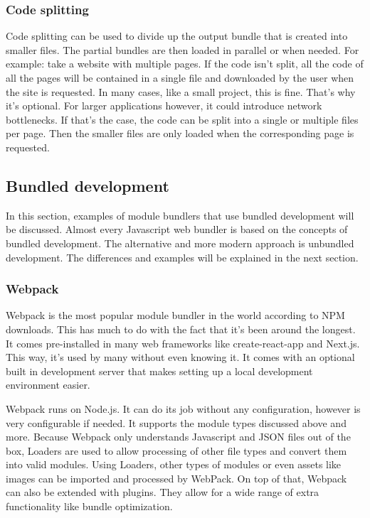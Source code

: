 \subsubsection{Code splitting}
Code splitting can be used to divide up the output bundle that is created into smaller files. The partial bundles are then loaded in parallel or when needed. For example: take a website with multiple pages. If the code isn’t split, all the code of all the pages will be contained in a single file and downloaded by the user when the site is requested. In many cases, like a small project, this is fine. That’s why it’s optional. For larger applications however, it could introduce network bottlenecks. If that’s the case, the code can be split into a single or multiple files per page. Then the smaller files are only loaded when the corresponding page is requested. 

\subsection{Bundled development}

In this section, examples of module bundlers that use bundled development will be discussed. Almost every Javascript web bundler is based on the concepts of bundled development. The alternative and more modern approach is unbundled development. The differences and examples will be explained in the next section. 

\subsubsection{Webpack}

Webpack is the most popular module bundler in the world according to NPM downloads. This has much to do with the fact that it's been around the longest. It comes pre-installed in many web frameworks like create-react-app and Next.js. This way, it’s used by many without even knowing it. It comes with an optional built in development server that makes setting up a local development environment easier.

Webpack runs on Node.js. It can do its job without any configuration, however is very configurable if needed. It supports the module types discussed above and more. 
Because Webpack only understands Javascript and JSON files out of the box, Loaders are used to allow processing of other file types and convert them into valid modules.
Using Loaders, other types of modules or even assets like images can be imported and processed by WebPack. On top of that, Webpack can also be extended with plugins. They allow for a wide range of extra functionality like bundle optimization. 


